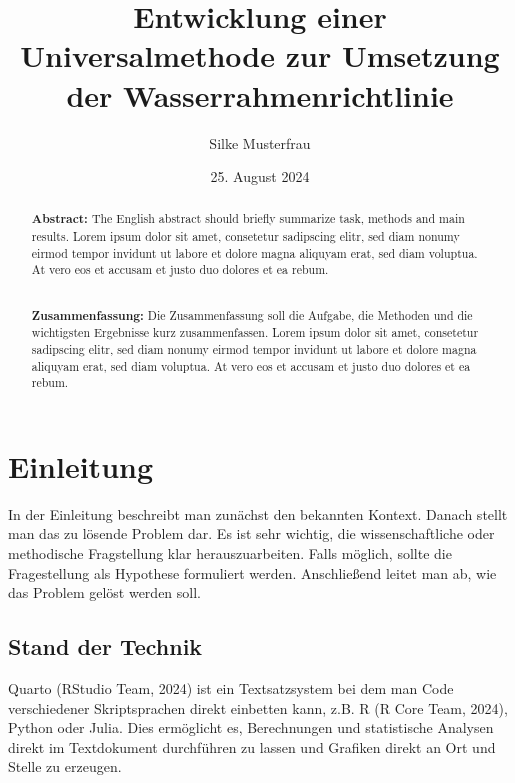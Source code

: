 \documentclass[
  11pt,
  a4paper,
]{tudscrreprt}
\institute{Institut für Hydrobiologie}
\title{Entwicklung einer Universalmethode zur Umsetzung der
Wasserrahmenrichtlinie}
\author{Silke Musterfrau}
\date{25. August 2024}
\renewcommand*\contentsname{Inhaltsverzeichnis}
\newcommand\contentsname{Inhaltsverzeichnis}
\begin{document}
\maketitle
\begin{abstract}
\textbf{Abstract:} The English abstract should briefly summarize task,
methods and main results. Lorem ipsum dolor sit amet, consetetur
sadipscing elitr, sed diam nonumy eirmod tempor invidunt ut labore et
dolore magna aliquyam erat, sed diam voluptua. At vero eos et accusam et
justo duo dolores et ea rebum.\\
\strut \\
\textbf{Zusammenfassung:} Die Zusammenfassung soll die Aufgabe, die
Methoden und die wichtigsten Ergebnisse kurz zusammenfassen. Lorem ipsum
dolor sit amet, consetetur sadipscing elitr, sed diam nonumy eirmod
tempor invidunt ut labore et dolore magna aliquyam erat, sed diam
voluptua. At vero eos et accusam et justo duo dolores et ea rebum.
\end{abstract}

\renewcommand*\contentsname{Inhaltsverzeichnis}
{
\hypersetup{linkcolor=}
\setcounter{tocdepth}{2}
\tableofcontents
}
\listoffigures
\listoftables
{}

\chapter{Einleitung}\label{einleitung}

In der Einleitung beschreibt man zunächst den bekannten Kontext. Danach
stellt man das zu lösende Problem dar. Es ist sehr wichtig, die
wissenschaftliche oder methodische Fragstellung klar herauszuarbeiten.
Falls möglich, sollte die Fragestellung als Hypothese formuliert werden.
Anschließend leitet man ab, wie das Problem gelöst werden soll.

\section{Stand der Technik}\label{stand-der-technik}

Quarto (RStudio Team, 2024) ist ein Textsatzsystem bei dem man Code
verschiedener Skriptsprachen direkt einbetten kann, z.B. R (R Core Team,
2024), Python oder Julia. Dies ermöglicht es, Berechnungen und
statistische Analysen direkt im Textdokument durchführen zu lassen und
Grafiken direkt an Ort und Stelle zu erzeugen.
\end{document}

